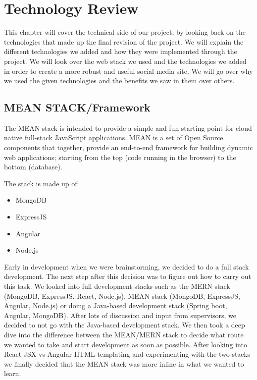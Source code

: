 \chapter{Technology Review} \label{techreview}
This chapter will cover the technical side of our project, by looking back on the technologies that made up the final revision of the project. We will explain the different technologies we added and how they were implemented through the project. We will look over the web stack we used and the technologies we added in order to create a more robust and useful social media site. We will go over why we used the given technologies and the benefits we saw in them over others.

\section{MEAN STACK/Framework} \label{meanstack}
The MEAN stack is intended to provide a simple and fun starting point for cloud native full-stack JavaScript applications. MEAN is a set of Open Source components that together, provide an end-to-end framework for building dynamic web applications; starting from the top (code running in the browser) to the bottom (database).  

The stack is made up of:

\begin{itemize}
\item MongoDB
\item ExpressJS
\item Angular
\item Node.js
\end{itemize}

Early in development when we were brainstorming, we decided to do a full stack development. The next step after this decision was to figure out how to carry out this task. We looked into full development stacks such as the MERN stack (MongoDB, ExpressJS, React, Node.js), MEAN stack (MongoDB, ExpressJS, Angular, Node.js) or doing a Java-based development stack (Spring boot, Angular, MongoDB). After lots of discussion and input from supervisors, we decided to not go with the Java-based development stack. We then took a deep dive into the difference between the MEAN/MERN stack to decide what route we wanted to take and start development as soon as possible. After looking into React JSX vs Angular HTML templating and experimenting with the two stacks we finally decided that the MEAN stack was more inline in what we wanted to learn.

